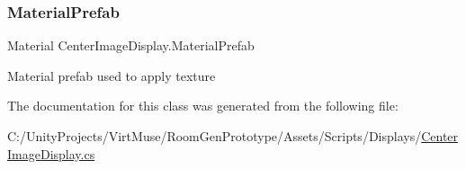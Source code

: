 \subsubsection{\texorpdfstring{Material\+Prefab}{MaterialPrefab}}
{\footnotesize\ttfamily Material Center\+Image\+Display.\+Material\+Prefab\hspace{0.3cm}{\ttfamily [private]}}



Material prefab used to apply texture 



The documentation for this class was generated from the following file\+:\begin{DoxyCompactItemize}
\item 
C\+:/\+Unity\+Projects/\+Virt\+Muse/\+Room\+Gen\+Prototype/\+Assets/\+Scripts/\+Displays/\mbox{\hyperlink{_center_image_display_8cs}{Center\+Image\+Display.\+cs}}\end{DoxyCompactItemize}

